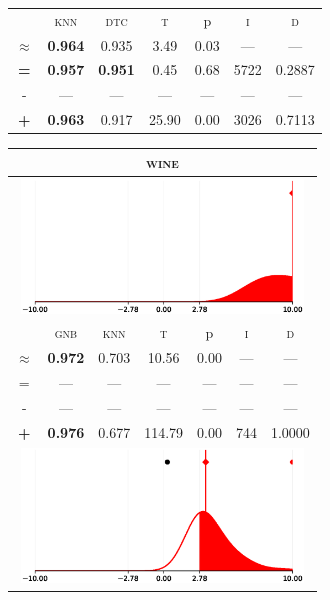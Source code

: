 \begin{tabular}{c||cc||c|c|c||c}
\midrule	&\textsc{knn} & \textsc{dtc} & \textsc{t} & p & \textsc{i} & \textsc{d}\\
	\color{red} $\approx$ & \color{red} \bfseries 0.964 &\color{red}   0.935 & 3.49 & 0.03 & --- & ---\\\midrule
	{\bfseries\color{black}\tiny=}& \color{black} \bfseries 0.957 & \color{black} \bfseries 0.951 & 0.45 & 0.68 & 5722 & \color{black} 0.2887\\
	{\tiny-}& --- & --- & --- & --- & --- & ---\\
	{\bfseries\color{red}\tiny+}& \color{red} \bfseries 0.963 & \color{red}  0.917 & 25.90 & 0.00 & 3026 & \color{red} 0.7113\\
\bottomrule\end{tabular}


\begin{tabular}{c||cc||c|c|c||c}
	\toprule
	\multicolumn{7}{c}{\textsc{wine}}\\
	\bottomrule
	\multicolumn{7}{c}{\includegraphics[width=7.5cm, trim=30 0 30 0]{figures/wine_0.eps}}\\

\midrule	&\textsc{gnb} & \textsc{knn} & \textsc{t} & p & \textsc{i} & \textsc{d}\\
	\color{red} $\approx$ & \color{red} \bfseries 0.972 &\color{red}   0.703 & 10.56 & 0.00 & --- & ---\\\midrule
	{\tiny=}& --- & --- & --- & --- & --- & ---\\
	{\tiny-}& --- & --- & --- & --- & --- & ---\\
	{\bfseries\color{red}\tiny+}& \color{red} \bfseries 0.976 & \color{red}  0.677 & 114.79 & 0.00 & 744 & \color{red} 1.0000\\
	\bottomrule
	\multicolumn{7}{c}{\includegraphics[width=7.5cm, trim=30 0 30 0]{figures/wine_1.eps}}\\


\end{tabular}
